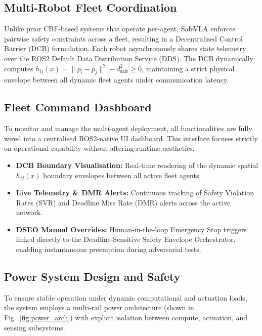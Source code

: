 \documentclass[10pt,twocolumn]{article}
\begin{document}
\subsection{Multi-Robot Fleet Coordination}
Unlike prior CBF-based systems that operate per-agent, SafeVLA enforces pairwise safety constraints across a fleet, resulting in a Decentralised Control Barrier (DCB) formulation. Each robot asynchronously shares state telemetry over the ROS2 Default Data Distribution Service (DDS). The DCB dynamically computes $h_{ij}(x) = \|p_i - p_j\|^2 - d_{\text{safe}}^2 \ge 0$, maintaining a strict physical envelope between all dynamic fleet agents under communication latency. 

\subsection{Fleet Command Dashboard}
\label{sec:ui_dashboard}
To monitor and manage the multi-agent deployment, all functionalities are fully wired into a centralised ROS2-native UI dashboard. This interface focuses strictly on operational capability without altering runtime aesthetics:
\begin{itemize}
    \item \textbf{DCB Boundary Visualisation:} Real-time rendering of the dynamic spatial $h_{ij}(x)$ boundary envelopes between all active fleet agents.
    \item \textbf{Live Telemetry \& DMR Alerts:} Continuous tracking of Safety Violation Rates (SVR) and Deadline Miss Rate (DMR) alerts across the active network.
    \item \textbf{DSEO Manual Overrides:} Human-in-the-loop Emergency Stop triggers linked directly to the Deadline-Sensitive Safety Envelope Orchestrator, enabling instantaneous preemption during adversarial tests.
\end{itemize}

\subsection{Power System Design and Safety}
To ensure stable operation under dynamic computational and actuation loads, the system employs a multi-rail power architecture (shown in Fig.~\ref{fig:power_arch}) with explicit isolation between compute, actuation, and sensing subsystems.
\end{document}
